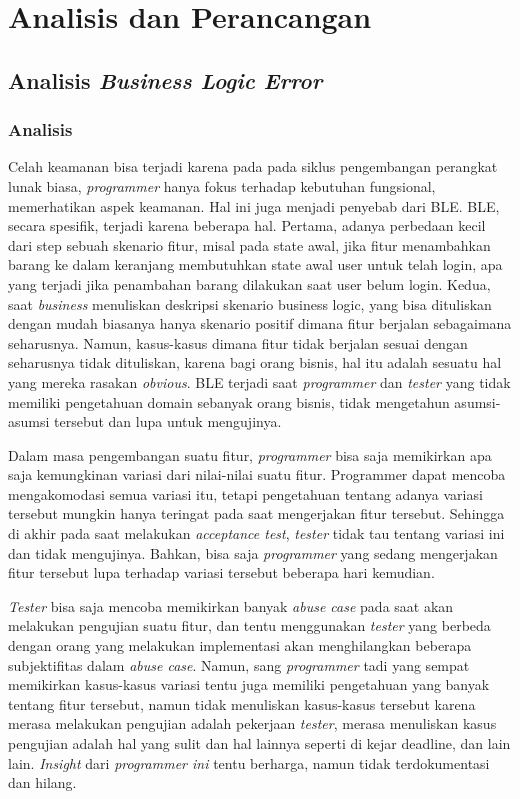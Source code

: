 \chapter{Analisis dan Perancangan}

\section{Analisis \emph{Business Logic Error}}

\subsection{Analisis}

Celah keamanan bisa terjadi karena pada pada siklus pengembangan perangkat lunak
biasa, \emph{programmer} hanya fokus terhadap kebutuhan fungsional,
memerhatikan aspek keamanan. Hal ini juga menjadi penyebab dari BLE.
BLE, secara spesifik, terjadi karena beberapa hal.
Pertama, adanya perbedaan kecil dari step sebuah skenario fitur, misal pada state awal,
jika fitur
menambahkan barang ke dalam keranjang membutuhkan state awal user untuk telah login,
apa yang terjadi jika penambahan barang dilakukan saat user belum login.
Kedua, saat \emph{business} menuliskan deskripsi skenario business logic,
yang bisa dituliskan dengan mudah biasanya hanya skenario positif dimana
fitur berjalan sebagaimana seharusnya. Namun, kasus-kasus dimana fitur
tidak berjalan sesuai dengan seharusnya tidak dituliskan, karena bagi orang bisnis,
hal itu adalah sesuatu hal yang mereka rasakan \emph{obvious}.
BLE terjadi saat \emph{programmer} dan \emph{tester} yang tidak memiliki
pengetahuan domain sebanyak orang bisnis, tidak mengetahun asumsi-asumsi tersebut dan lupa
untuk mengujinya.

Dalam masa pengembangan suatu fitur, \emph{programmer} bisa saja memikirkan
apa saja kemungkinan variasi dari nilai-nilai suatu fitur. Programmer
dapat mencoba mengakomodasi semua variasi itu, tetapi pengetahuan tentang
adanya variasi tersebut mungkin hanya teringat pada saat mengerjakan
fitur tersebut. Sehingga di akhir pada saat melakukan \emph{acceptance test},
\emph{tester} tidak tau tentang variasi ini dan tidak mengujinya.
Bahkan, bisa saja \emph{programmer} yang sedang mengerjakan fitur tersebut
lupa terhadap variasi tersebut beberapa hari kemudian.

\emph{Tester} bisa saja mencoba memikirkan banyak \emph{abuse case} pada saat
akan melakukan pengujian suatu fitur, dan tentu menggunakan \emph{tester} yang
berbeda dengan orang yang melakukan implementasi akan menghilangkan beberapa
subjektifitas dalam \emph{abuse case}. Namun, sang \emph{programmer} tadi yang
sempat memikirkan kasus-kasus variasi tentu juga memiliki pengetahuan yang banyak
tentang fitur tersebut, namun tidak menuliskan kasus-kasus tersebut karena merasa 
melakukan pengujian adalah pekerjaan \emph{tester}, merasa menuliskan kasus pengujian
adalah hal yang sulit dan hal lainnya seperti di kejar
deadline, dan lain lain. \emph{Insight} dari \emph{programmer ini} tentu berharga,
namun tidak terdokumentasi dan hilang.

